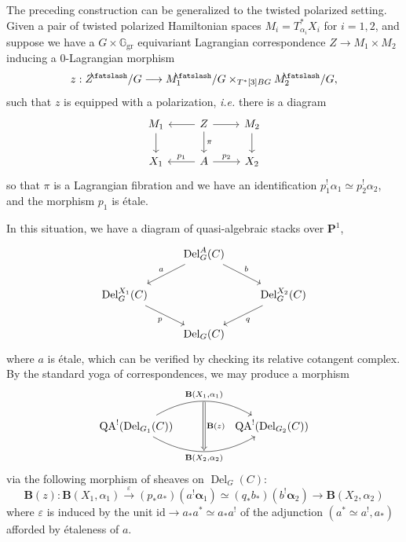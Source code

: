 \documentclass[11pt, a4paper]{amsart}
\numberwithin{equation}{section}
\theoremstyle{definition}
\theoremstyle{remark}
\DeclareMathOperator{\Del}{Del}
\DeclareMathOperator{\QA}{QA}
\newcommand{\shear}{{\mathbin{\mkern-6mu\fatslash}}}
\newcommand{\Ggr}{\mathbb{G}_{\mathrm{gr}}}
\newcommand{\bB}{\mathbf{B}}
\renewcommand{\P}{\mathbf{P}}
\renewcommand{\to}{\longrightarrow}
\begin{document}
The preceding construction can be generalized to the twisted polarized setting. Given a pair of twisted polarized Hamiltonian spaces $M_i = T^*_{\alpha_i}X_i$ for $i = 1,2$, and suppose we have a $G \times \Ggr$ equivariant Lagrangian correspondence $Z \to M_1 \times M_2$ inducing a 0-Lagrangian morphism
$$z: Z^\shear/G \longrightarrow M_1^\shear/G \times_{T^*[3]BG} M_2^\shear/G,$$
such that $z$ is equipped with a polarization, {\it i.e.} there is a diagram
    \begin{equation}
        \begin{tikzcd}
	{M_1} & Z & {M_2} \\
	{X_1} & A & {X_2}
	\arrow[from=1-1, to=2-1]
	\arrow[from=1-2, to=1-1]
	\arrow[from=1-2, to=1-3]
	\arrow["\pi", from=1-2, to=2-2]
	\arrow[from=1-3, to=2-3]
	\arrow["{p_1}"', from=2-2, to=2-1]
	\arrow["{p_2}", from=2-2, to=2-3]
\end{tikzcd}
    \end{equation}
    so that $\pi$ is a Lagrangian fibration and we have an identification $p_1^!\alpha_1 \simeq p_2^!\alpha_2$, and the morphism $p_1$ is \'etale.

In this situation, we have a diagram of quasi-algebraic stacks over $\P^1$,
\begin{equation}
    \begin{tikzcd}
	& {\Del_G^A(C)} & \\
	{\Del_G^{X_1}(C)} && {\Del_G^{X_2}(C)} \\
	& {\Del_G(C)}
	\arrow["a"', from=1-2, to=2-1]
	\arrow["b", from=1-2, to=2-3]
	\arrow["p"', from=2-1, to=3-2]
	\arrow["q", from=2-3, to=3-2]
\end{tikzcd}
\end{equation}
where $a$ is \'etale, which can be verified by checking its relative cotangent complex. By the standard yoga of correspondences, we may produce a morphism
\begin{equation}
    \begin{tikzcd}
	{\QA^!(\Del_{G_1}(C))} && {\QA^!(\Del_{G_2}(C))}
	\arrow[""{name=0, anchor=center, inner sep=0}, "{\bB(X_1,\alpha_1)}", bend left, from=1-1, to=1-3]
	\arrow[""{name=1, anchor=center, inner sep=0}, "{\bB(X_2,\alpha_2)}"', bend right, from=1-1, to=1-3]
	\arrow["{\bB(z)}", Rightarrow, from=0, to=1]
\end{tikzcd}
\end{equation}
via the following morphism of sheaves on $\Del_G(C)$:
\begin{equation}
    \bB(z): \bB(X_1, \alpha_1) \overset{\varepsilon}{\to} (p_*a_*)(a^! \boldsymbol{\alpha}_1)\simeq (q_*b_*)(b^!\boldsymbol{\alpha}_2) \to \bB(X_2,\alpha_2)
\end{equation}
where $\varepsilon$ is induced by the unit $\mathrm{id} \to a_*a^* \simeq a_* a^!$ of the adjunction $(a^* \simeq a^!, a_*)$ afforded by \'etaleness of $a$.
\end{document}
